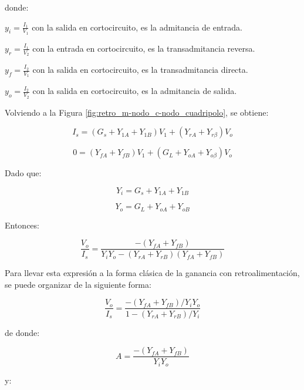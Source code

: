donde:

\( y_{i} = \frac{I_{1}}{V_{1}} \) con la salida en cortocircuito, es la admitancia de entrada.

\( y_{r} = \frac{I_{1}}{V_{2}} \) con la entrada en cortocircuito, es la transadmitancia reversa.

\( y_{f} = \frac{I_{2}}{V_{1}} \) con la salida en cortocircuito, es la transadmitancia directa.

\( y_{o} = \frac{I_{2}}{V_{2}} \) con la salida en cortocircuito, es la admitancia de salida.

Volviendo a la Figura \ref{fig:retro_m-nodo_c-nodo_cuadripolo}, se obtiene:

\begin{equation}
	I_{s} = (G_s + Y_{1A} + Y_{1B}) V_{1} + (Y_{rA} + Y_{r \beta}) V_o
\end{equation}

\begin{equation}
	0 = (Y_{fA} + Y_{fB}) V_{1} + (G_{L} + Y_{oA} + Y_{o \beta}) V_o
\end{equation}

Dado que:

\begin{equation}
	Y_{i} = G_{s} + Y_{1A} + Y_{1B}
\end{equation}

\begin{equation}
	Y_{o} = G_{L} + Y_{oA} + Y_{oB}
\end{equation}

Entonces:

\begin{equation}
	\frac{V_o}{I_s} = \frac{-(Y_{fA} + Y_{fB})}{Y_i Y_o - (Y_{rA} + Y_{rB})(Y_{fA} + Y_{fB})}
\end{equation}

Para llevar esta expresión a la forma clásica de la ganancia con retroalimentación, se puede organizar de la siguiente forma:

\begin{equation}
	\frac{V_o}{I_s} = \frac{-(Y_{fA} + Y_{fB}) / Y_i Y_o}{1 - (Y_{rA} + Y_{rB}) / Y_i}
\end{equation}

de donde:

\begin{equation} \label{equ:retro_m-nodo_c-nodo_orig-A}
	A = \frac{-(Y_{fA} + Y_{fB})}{Y_i Y_o}
\end{equation}

y:

